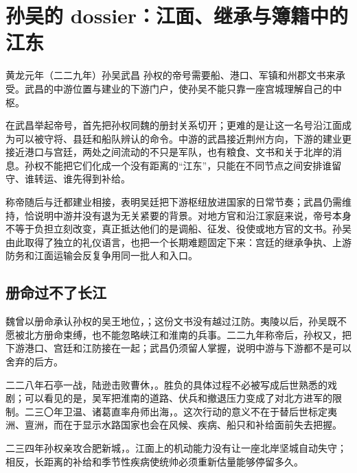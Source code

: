 \section{孙吴的 dossier：江面、继承与簿籍中的江东}
\label{sec:sun-wu-south}

\begin{event}{}{黄龙元年（二二九年）}{孙吴}{武昌}
孙权的帝号需要船、港口、军镇和州郡文书来承受。武昌的中游位置与建业的下游门户，使孙吴不能只靠一座宫城理解自己的中枢。

在武昌举起帝号，首先把孙权同魏的册封关系切开；更难的是让这一名号沿江面成为可以被守将、县廷和船队辨认的命令。中游的武昌接近荆州方向，下游的建业更接近港口与宫廷，两处之间流动的不只是军队，也有粮食、文书和关于北岸的消息。孙权不能把它们化成一个没有距离的“江东”，只能在不同节点之间安排谁留守、谁转运、谁先得到补给。

称帝随后与迁都建业相接，表明吴廷把下游枢纽放进国家的日常节奏；武昌仍需维持，恰说明中游并没有退为无关紧要的背景。对地方官和沿江家庭来说，帝号本身不等于负担立刻改变，真正抵达他们的是调船、征发、役使或地方官的文书。孙吴由此取得了独立的礼仪语言，也把一个长期难题固定下来：宫廷的继承争执、上游防务和江面运输会反复争用同一批人和入口。
\end{event}



\subsection{册命过不了长江}

魏曾以册命承认孙权的吴王地位，；这份文书没有越过江防。夷陵以后，孙吴既不愿被北方册命束缚，也不能忽略峡江和淮南的兵事。二二九年称帝后，孙权又，把下游港口、宫廷和江防接在一起；武昌仍须留人掌握，说明中游与下游都不是可以舍弃的后方。

二二八年石亭一战，陆逊击败曹休，。胜负的具体过程不必被写成后世熟悉的戏剧；可以看见的是，吴军把淮南的道路、伏兵和撤退压力变成了对北方进军的限制。二三〇年卫温、诸葛直率舟师出海，。这次行动的意义不在于替后世标定夷洲、亶洲，而在于显示水路国家也会在风候、疾病、船只和补给面前失去把握。

二三四年孙权亲攻合肥新城，。江面上的机动能力没有让一座北岸坚城自动失守；相反，长距离的补给和季节性疾病使统帅必须重新估量能够停留多久。

